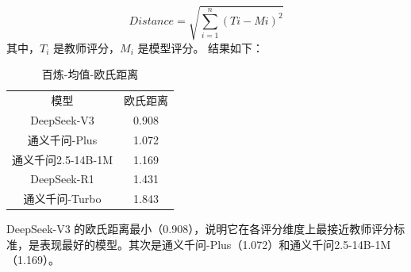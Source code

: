 \documentclass{article}
\begin{document}
\[Distance=\sqrt{\sum_{i=1}^{n} ​(Ti​−Mi​)^{2}}\]
其中，$T_{i}$ 是教师评分，$M_{i}$ 是模型评分。 结果如下：

\begin{table}
    \centering
    \begin{tabular}{cc}
         模型& 欧氏距离\\
         DeepSeek-V3& 0.908\\
         通义千问-Plus& 1.072\\
         通义千问2.5-14B-1M& 1.169\\
         DeepSeek-R1& 1.431\\
         通义千问-Turbo& 1.843\\
    \end{tabular}
    \caption{百炼-均值-欧氏距离}
    \label{tab:bailian-average-EuclideanDistance}
\end{table}

DeepSeek-V3 的欧氏距离最小（0.908），说明它在各评分维度上最接近教师评分标准，是表现最好的模型。其次是通义千问-Plus（1.072）和通义千问2.5-14B-1M（1.169）。 
\end{document}
